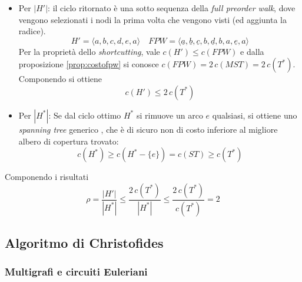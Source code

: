 \begin{itemize}
    \item Per $|H'|$: il ciclo ritornato è una sotto sequenza della \emph{full preorder walk}, dove vengono selezionati i nodi la prima volta che vengono visti (ed aggiunta la radice).
        \begin{equation*}
            H' = \langle a,b,c,d,e,a \rangle
            \quad
            FPW = \langle \underline{a},\underline{b},\underline{c},b,\underline{d},b,a,\underline{e},a \rangle
        \end{equation*}
        Per la proprietà dello \emph{shortcutting}, vale $
        c(H') \leq c(FPW)
        $
        e dalla proposizione \ref{prop:costofpw} si conosce $
        c(FPW) = 2 \, c(MST)
        = 2 \, c(T^*)
        $.
        Componendo si ottiene 
        \begin{equation*}
            c(H')
            \leq 2 \, c(T^*)
        \end{equation*}
    \item Per $|H^*|$:
        Se dal ciclo ottimo
        $H^*$
        si rimuove un arco $e$ qualsiasi, si ottiene uno \emph{spanning tree}
        generico
        , che è di sicuro non di costo inferiore al migliore albero di copertura trovato:
        \begin{equation*}
            c(H^*) \geq 
            c(H^* - \{ e \} ) =
            c(ST) \geq 
            c(T^*)
        \end{equation*}
\end{itemize}
Componendo i risultati
\begin{equation*}
    \rho =
    \frac{
        |H'|
    }{
        |H^*|
    }
    \leq
    \frac{
        2 \, c(T^*)
    }{
        |H^*|
    }
    \leq
    \frac{
        2 \, c(T^*)
    }{
        c(T^*)
    }
    = 2
\end{equation*}

\subsection{Algoritmo di Christofides}

\subsubsection{Multigrafi e circuiti Euleriani}

